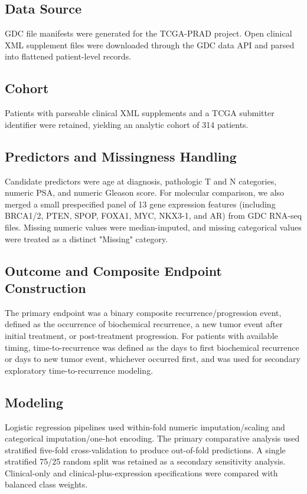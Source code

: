 \documentclass[11pt]{article}
\begin{document}
\subsection{Data Source}
GDC file manifests were generated for the TCGA-PRAD project. Open clinical XML supplement files were downloaded through the GDC data API and parsed into flattened patient-level records.

\subsection{Cohort}
Patients with parseable clinical XML supplements and a TCGA submitter identifier were retained, yielding an analytic cohort of 314 patients.

\subsection{Predictors and Missingness Handling}
Candidate predictors were age at diagnosis, pathologic T and N categories, numeric PSA, and numeric Gleason score. For molecular comparison, we also merged a small prespecified panel of 13 gene expression features (including BRCA1/2, PTEN, SPOP, FOXA1, MYC, NKX3-1, and AR) from GDC RNA-seq files. Missing numeric values were median-imputed, and missing categorical values were treated as a distinct "Missing" category.

\subsection{Outcome and Composite Endpoint Construction}
The primary endpoint was a binary composite recurrence/progression event, defined as the occurrence of biochemical recurrence, a new tumor event after initial treatment, or post-treatment progression. For patients with available timing, time-to-recurrence was defined as the days to first biochemical recurrence or days to new tumor event, whichever occurred first, and was used for secondary exploratory time-to-recurrence modeling.

\subsection{Modeling}
Logistic regression pipelines used within-fold numeric imputation/scaling and categorical imputation/one-hot encoding. The primary comparative analysis used stratified five-fold cross-validation to produce out-of-fold predictions. A single stratified 75/25 random split was retained as a secondary sensitivity analysis. Clinical-only and clinical-plus-expression specifications were compared with balanced class weights.
\end{document}
